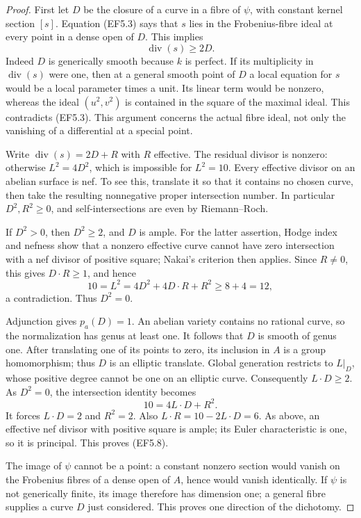 \begin{proof}
First let \(D\) be the closure of a curve in a fibre of
\(\psi\), with constant kernel section \([s]\).
Equation (EF5.3) says that \(s\) lies in the Frobenius-fibre
ideal at every point in a dense open of \(D\). This implies
\[
                         \operatorname{div}(s)\ge2D.
 \tag{EF5.10}
\]
Indeed \(D\) is generically smooth because \(k\) is perfect.
If its multiplicity in \(\operatorname{div}(s)\) were one,
then at a general smooth point of \(D\) a local equation for
\(s\) would be a local parameter times a unit. Its linear
term would be nonzero, whereas the ideal \((u^2,v^2)\) is
contained in the square of the maximal ideal. This contradicts
(EF5.3). This argument concerns the actual fibre ideal, not only
the vanishing of a differential at a special point.

Write \(\operatorname{div}(s)=2D+R\) with \(R\) effective.
The residual divisor is nonzero: otherwise \(L^2=4D^2\),
which is impossible for \(L^2=10\). Every effective divisor
on an abelian surface is nef. To see this, translate it so that
it contains no chosen curve, then take the resulting nonnegative
proper intersection number. In particular \(D^2,R^2\ge0\),
and self-intersections are even by Riemann--Roch.

If \(D^2>0\), then \(D^2\ge2\), and \(D\) is ample.
For the latter assertion, Hodge index and nefness show that a
nonzero effective curve cannot have zero intersection with a
nef divisor of positive square; Nakai's criterion then applies.
Since \(R\ne0\), this gives \(D\cdot R\ge1\), and hence
\[
       10=L^2=4D^2+4D\cdot R+R^2\ge8+4=12,
\]
a contradiction. Thus \(D^2=0\).

Adjunction gives \(p_a(D)=1\). An abelian variety contains no
rational curve, so the normalization has genus at least one.
It follows that \(D\) is smooth of genus one. After translating
one of its points to zero, its inclusion in \(A\) is a group
homomorphism; thus \(D\) is an elliptic translate. Global
generation restricts to \(L|_D\), whose positive degree cannot
be one on an elliptic curve. Consequently \(L\cdot D\ge2\).
As \(D^2=0\), the intersection identity becomes
\[
                    10=4L\cdot D+R^2.
 \tag{EF5.11}
\]
It forces \(L\cdot D=2\) and \(R^2=2\). Also
\(L\cdot R=10-2L\cdot D=6\). As above, an effective nef
divisor with positive square is ample; its Euler characteristic
is one, so it is principal. This proves (EF5.8).

The image of \(\psi\) cannot be a point: a constant nonzero
section would vanish on the Frobenius fibres of a dense open
of \(A\), hence would vanish identically. If \(\psi\) is
not generically finite, its image therefore has dimension one;
a general fibre supplies a curve \(D\) just considered.
This proves one direction of the dichotomy.


\end{proof}
